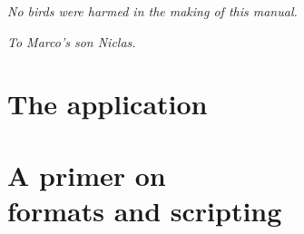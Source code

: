 \documentclass[a4paper,oneside,12pt]{memoir}
\begin{document}
\vspace*{25em}

\begin{flushright}
\em No birds were harmed in the making of this manual.
\end{flushright}






\cleardoublepage

\vspace*{25em}

\begin{flushright}
\em To Marco's son Niclas.
\end{flushright}

\cleardoublepage

\tableofcontents*

\cleardoublepage

%


\mainmatter



\part{The application}
\label{part:application}







\part[A primer on formats and scripting]{A primer on\\ formats and scripting}
\label{part:primer}




\printunsrtglossary
\end{document}
